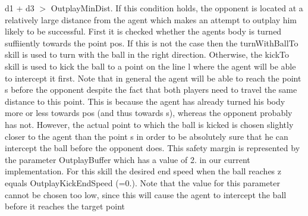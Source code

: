 \begin{DoxyItemize}
\item d1 + d3 $>$ Outplay\+Min\+Dist. If this condition holds, the opponent is located at a relatively large distance from the agent which makes an attempt to outplay him likely to be successful. First it is checked whether the agent\textquotesingle{}s body is turned suffiiently towards the point \textquotesingle{}pos\textquotesingle{}. If this is not the case then the turn\+With\+Ball\+To skill is used to turn with the ball in the right direction. Otherwise, the kick\+To skill is used to kick the ball to a point on the line l where the agent will be able to intercept it first. Note that in general the agent will be able to reach the point s before the opponent despite the fact that both players need to travel the same distance to this point. This is because the agent has already turned his body more or less towards \textquotesingle{}pos\textquotesingle{} (and thus towards s), whereas the opponent probably has not. However, the actual point to which the ball is kicked is chosen slightly closer to the agent than the point s in order to be absolutely sure that he can intercept the ball before the opponent does. This safety margin is represented by the parameter Outplay\+Buffer which has a value of 2. in our current implementation. For this skill the desired end speed when the ball reaches z equals Outplay\+Kick\+End\+Speed (=0.). Note that the value for this parameter cannot be chosen too low, since this will cause the agent to intercept the ball before it reaches the target point

\end{DoxyItemize}
